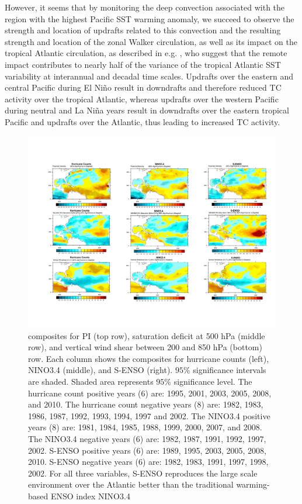 However, it seems that by monitoring the deep convection associated with the region with the highest Pacific SST warming anomaly, we succeed to observe the strength and location of updrafts related to this convection and the resulting strength and location of the zonal Walker circulation, as well as its impact on the tropical Atlantic circulation, as described in e.g. \cite{liu2004remote}, who  suggest that the remote impact contributes to nearly half of the variance of the tropical Atlantic SST variability at interannual and decadal time scales. Updrafts over the eastern and central Pacific during El Ni\~no result in downdrafts and therefore reduced TC activity over the tropical Atlantic, whereas updrafts over the western Pacific during neutral and La Ni\~na years result in downdrafts over the eastern tropical Pacific and updrafts over the Atlantic, thus leading to increased TC activity.

\begin{figure}[htbp]

\hspace{-2.5cm}		
\includegraphics[width=7in]{figures/3_by_3_composites.pdf}
	\caption{composites for PI (top row), saturation deficit at 500 hPa (middle row), and vertical wind shear between 200 and 850 hPa (bottom) row. Each column shows the composites for hurricane counts (left), NINO3.4 (middle), and S-ENSO (right). $95\%$ significance intervals are shaded. Shaded area represents $95\%$ significance level. The hurricane count positive years (6) are: 1995, 2001, 2003, 2005, 2008, and 2010. The hurricane count negative years (8) are: 1982, 1983, 1986, 1987, 1992, 1993, 1994, 1997 and 2002. The NINO3.4 positive years (8) are: 1981, 1984, 1985, 1988, 1999, 2000, 2007, and 2008. The NINO3.4 negative years (6) are: 1982, 1987, 1991, 1992, 1997, 2002. S-ENSO positive years (6) are: 1989, 1995, 2003, 2005, 2008, 2010. S-ENSO negative years (6) are: 1982, 1983, 1991, 1997, 1998, 2002. For all three variables, S-ENSO reproduces the large scale environment over the Atlantic better than the traditional warming-based ENSO index NINO3.4}
	\label{fig:olr_comp}
\end{figure}

\newpage